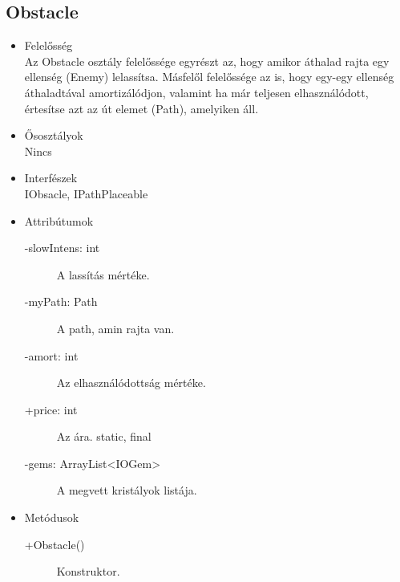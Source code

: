 \subsection{Obstacle}
\begin{itemize}
\item Felelősség\\
Az Obstacle osztály felelőssége egyrészt az, hogy amikor áthalad rajta egy ellenség (Enemy) lelassítsa. Másfelől felelőssége az is, hogy egy-egy ellenség  áthaladtával amortizálódjon, valamint ha már teljesen elhasználódott, értesítse azt az út elemet (Path), amelyiken áll.
\item Ősosztályok\\
Nincs
\item Interfészek\\
IObsacle, IPathPlaceable
\item Attribútumok\\
	\begin{description}
	\item[-slowIntens: int] A lassítás mértéke. 
\item[-myPath: Path] A path, amin rajta van. 
\item[-amort: int] Az elhasználódottság mértéke. 
\item[+price: int] Az ára. static, final
\item[-gems: ArrayList<IOGem>] A megvett kristályok listája. 


	\end{description}
\item Metódusok\\
	\begin{description}
		
		\item[+Obstacle()] Konstruktor. 
		
		
	\end{description}
\end{itemize}
